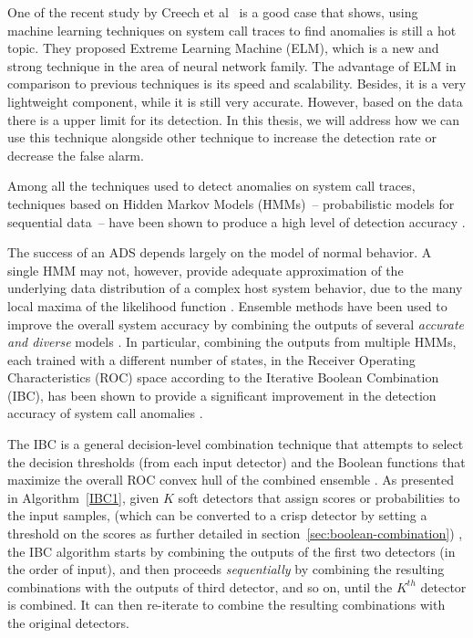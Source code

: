One of the recent study by Creech et al~\cite{Creech2014} is a good case that shows, using machine learning techniques on system call traces to find anomalies is still a hot topic. They proposed Extreme Learning Machine (ELM), which is a new and strong technique in the area of neural network family. The advantage of ELM in comparison to previous techniques is its speed and scalability. Besides, it is a very lightweight component, while it is still very accurate. However, based on the data there is a upper limit for its detection. In this thesis, we will address how we can use this technique alongside other technique to increase the detection rate or decrease the false alarm.


Among all the techniques used to detect anomalies on system call traces, techniques based on Hidden Markov Models (HMMs)~-- probabilistic models for sequential data~-- have been shown to produce a high level of detection accuracy \cite{Du2004,Gao2002,Hoang2004,Hu2010,Wang2004,Warrender1999,Zhang2003,Khreich2009-ICC, Sultana2012, Murtaza2012}.

The success of an ADS depends largely on the model of normal behavior.
A single HMM may not, however, provide adequate approximation of the underlying data distribution of a complex host system behavior, due to the many local maxima of the likelihood function \cite{Khreich2009-ICC}.
Ensemble methods have been used to improve the overall system accuracy by combining the outputs of several \textit{accurate and diverse} models \cite{Kittler1998,Dietterich2000,Kuncheva2004b,Zhou2012}.
In particular, combining the outputs from multiple HMMs, each trained with a different number of states, in the Receiver Operating Characteristics (ROC) space according to the Iterative Boolean Combination (IBC), has been shown to provide a significant improvement in the detection accuracy of system call anomalies \cite{Khreich2010-ICPR}.

The IBC is a general decision-level combination technique that attempts to select the decision thresholds (from each input detector) and the Boolean functions that maximize the overall ROC convex hull of the combined ensemble \cite{Khreich2010-ICPR}.
As presented in Algorithm~\ref{IBC1}, given $K$ soft detectors that assign scores or probabilities to the input samples, (which can be converted to a crisp detector by setting a threshold on the scores as further detailed in section~\ref{sec:boolean-combination}) , the IBC algorithm starts by combining the outputs of the first two detectors (in the order of input), and then proceeds \textit{sequentially} by combining the resulting combinations with the outputs of third detector, and so on, until the $K^{th}$ detector is combined.
It can then re-iterate to combine the resulting combinations with the original detectors.

